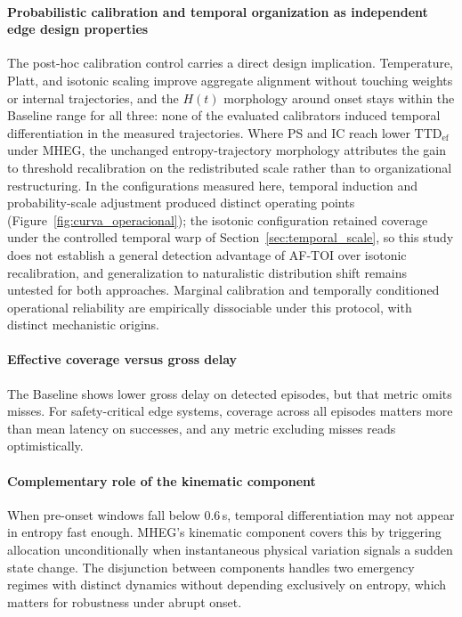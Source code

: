 \documentclass[a4paper,fleqn]{cas-dc}
\newcommand{\MHEG}{\mbox{MHEG}\xspace}
\begin{document}
\paragraph{Probabilistic calibration and temporal organization as
independent edge design properties}
The post-hoc calibration control carries a direct design implication.
Temperature, Platt, and isotonic scaling improve aggregate alignment without
touching weights or internal trajectories, and the $H(t)$ morphology around
onset stays within the Baseline range for all three: none of the evaluated
calibrators induced temporal differentiation in the measured trajectories. Where PS and IC reach lower
$\mathrm{TTD}_{\mathrm{ef}}$ under \MHEG, {\color{\revcolor}the unchanged
entropy-trajectory morphology} attributes the gain to threshold recalibration on
the redistributed scale rather than to organizational restructuring. {\color{\revcolor}In the configurations measured here, temporal induction
and probability-scale adjustment produced distinct operating points
(Figure~\ref{fig:curva_operacional}); the isotonic configuration retained
coverage under the controlled temporal warp of
Section~\ref{sec:temporal_scale}, so this study does not establish a general
detection advantage of \mbox{AF-TOI} over isotonic recalibration, and
generalization to naturalistic distribution shift remains untested for both
approaches.}
Marginal calibration and temporally conditioned operational reliability are
empirically dissociable under this protocol, with distinct mechanistic origins.
\paragraph{Effective coverage versus gross delay}
The Baseline shows lower gross delay on detected episodes, but that metric omits
misses. For safety-critical edge systems, coverage across all episodes matters
more than mean latency on successes, and any metric excluding misses reads
optimistically.
\paragraph{Complementary role of the kinematic component}
When pre-onset windows fall below 0.6\,s, temporal differentiation may not
appear in entropy fast enough. \MHEG's kinematic component covers this by
triggering allocation unconditionally when instantaneous physical variation
signals a sudden state change. The disjunction between components handles two
emergency regimes with distinct dynamics without depending exclusively on
entropy, which matters for robustness under abrupt onset.
\end{document}

